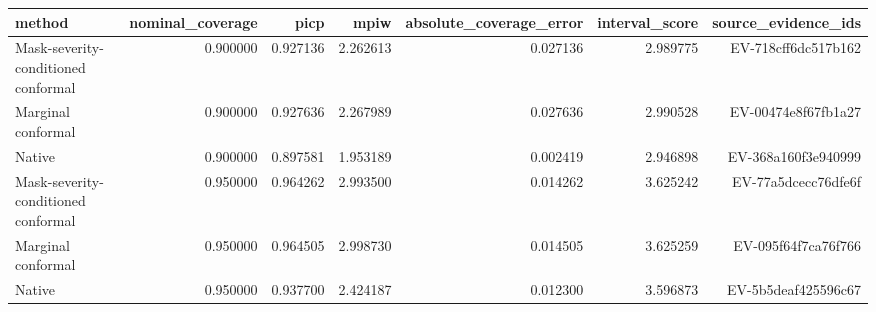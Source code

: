 \begin{tabular}{lrrrrrr}
\hline
method & nominal\_coverage & picp & mpiw & absolute\_coverage\_error & interval\_score & source\_evidence\_ids \\
\hline
Mask-severity-conditioned conformal & 0.900000 & 0.927136 & 2.262613 & 0.027136 & 2.989775 & EV-718cff6dc517b162 \\
Marginal conformal & 0.900000 & 0.927636 & 2.267989 & 0.027636 & 2.990528 & EV-00474e8f67fb1a27 \\
Native & 0.900000 & 0.897581 & 1.953189 & 0.002419 & 2.946898 & EV-368a160f3e940999 \\
Mask-severity-conditioned conformal & 0.950000 & 0.964262 & 2.993500 & 0.014262 & 3.625242 & EV-77a5dcecc76dfe6f \\
Marginal conformal & 0.950000 & 0.964505 & 2.998730 & 0.014505 & 3.625259 & EV-095f64f7ca76f766 \\
Native & 0.950000 & 0.937700 & 2.424187 & 0.012300 & 3.596873 & EV-5b5deaf425596c67 \\
\hline
\end{tabular}
